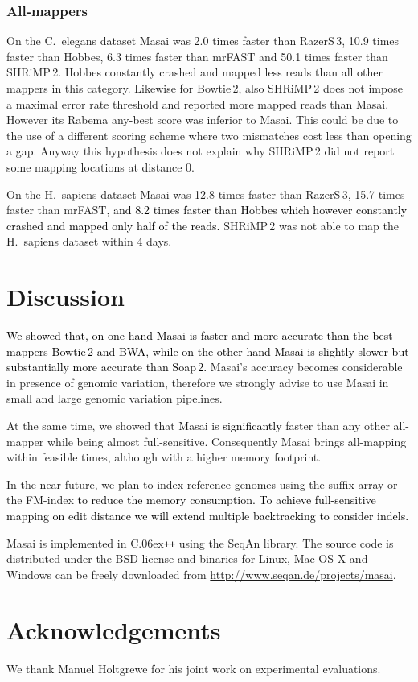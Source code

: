 \documentclass[a4,center,fleqn]{article}
\newcommand{\CC}{C\raise.06ex\hbox{\tt ++}\xspace}
\begin{document}
\subsubsection{All-mappers}
On the C.~elegans dataset Masai was 2.0 times faster than RazerS\,3, 10.9 times faster than Hobbes, 6.3 times faster than mrFAST and 50.1 times faster than SHRiMP\,2.
Hobbes constantly crashed and mapped less reads than all other mappers in this category.
Likewise for Bowtie\,2, also SHRiMP\,2 does not impose a maximal error rate threshold and reported more mapped reads than Masai.
However its Rabema any-best score was inferior to Masai.
This could be due to the use of a different scoring scheme where two mismatches cost less than opening a gap.
Anyway this hypothesis does not explain why SHRiMP\,2 did not report some mapping locations at distance 0.

On the H.~sapiens dataset Masai was 12.8 times faster than RazerS\,3, 15.7 times faster than mrFAST, \textcolor{black}{and 8.2 times faster than Hobbes which however constantly crashed and mapped only half of the reads.}
SHRiMP\,2 was not able to map the H.~sapiens dataset within 4 days.



\section{Discussion}

\textcolor{black}{
We showed that, on one hand Masai is faster and more accurate than the best-mappers Bowtie\,2 and BWA, while on the other hand Masai is slightly slower but substantially more accurate than Soap\,2.}
Masai's accuracy becomes considerable in presence of genomic variation, therefore we strongly advise to use Masai in small and large genomic variation pipelines.

At the same time, we showed that Masai is \textcolor{black}{significantly} faster than any other all-mapper while being almost full-sensitive. Consequently Masai brings all-mapping within feasible times, although with a higher memory footprint.

In the near future, we plan to index reference genomes using the suffix array or the FM-index \textcolor{black}{to reduce the memory consumption.
To achieve full-sensitive mapping on edit distance we will extend multiple backtracking to consider indels.}

Masai is implemented in \CC using the SeqAn library.
The source code is distributed under the BSD license and binaries for Linux, Mac OS X and Windows can be freely downloaded from \url{http://www.seqan.de/projects/masai}.



\section{Acknowledgements}
We thank Manuel Holtgrewe for his joint work on experimental evaluations.







\end{document}
